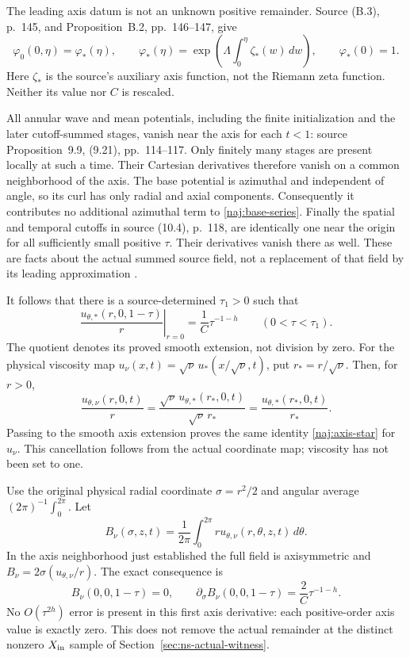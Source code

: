 The leading axis datum is not an unknown positive remainder. Source
(B.3), p.~145, and Proposition~B.2, pp.~146--147, give
\[
 \varphi_0(0,\eta)=\varphi_*(\eta),\qquad
 \varphi_*(\eta)=
  \exp\left(\Lambda\int_0^\eta\zeta_*(w)\,dw\right),\qquad
 \varphi_*(0)=1.
\]
Here \(\zeta_*\) is the source's auxiliary axis function, not the
Riemann zeta function. Neither its value nor \(C\) is rescaled.

All annular wave and mean potentials, including the finite
initialization and the later cutoff-summed stages, vanish near the axis
for each \(t<1\): source Proposition~9.9, (9.21), pp.~114--117.
Only finitely many stages are present locally at such a time. Their
Cartesian derivatives therefore vanish on a common neighborhood of the
axis. The base potential is azimuthal and independent of angle, so its
curl has only radial and axial components. Consequently it contributes
no additional azimuthal term to \eqref{naj:base-series}.
Finally the spatial and temporal cutoffs in source (10.4), p.~118,
are identically one near the origin for all sufficiently small
positive \(\tau\). Their derivatives vanish there as well.
These are facts about the actual summed source field, not a
replacement of that field by its leading approximation
\cite[Lemma 5.1; Proposition 5.5; (9.21); (10.4); (B.3)]{openaiNS2026release}.

It follows that there is a source-determined \(\tau_1>0\) such that
\begin{equation}\label{naj:axis-star}
 \left.\frac{u_{\theta,*}(r,0,1-\tau)}r\right|_{r=0}
       =\frac1C\tau^{-1-h}\qquad(0<\tau<\tau_1).
\end{equation}
The quotient denotes its proved smooth extension, not division by
zero. For the physical viscosity map
\(u_\nu(x,t)=\sqrt\nu\,u_*(x/\sqrt\nu,t)\), put
\(r_*=r/\sqrt\nu\). Then, for \(r>0\),
\[
 \frac{u_{\theta,\nu}(r,0,t)}r
 =\frac{\sqrt\nu\,u_{\theta,*}(r_*,0,t)}{\sqrt\nu\,r_*}
 =\frac{u_{\theta,*}(r_*,0,t)}{r_*}.
\]
Passing to the smooth axis extension proves the same identity
\eqref{naj:axis-star} for \(u_\nu\). This cancellation follows from the
actual coordinate map; viscosity has not been set to one.

Use the original physical radial coordinate
\(\sigma=r^2/2\) and angular average \( (2\pi)^{-1}\int_0^{2\pi}\).
Let
\[
 B_\nu(\sigma,z,t)=
    \frac1{2\pi}\int_0^{2\pi} r u_{\theta,\nu}(r,\theta,z,t)\,d\theta .
\]
In the axis neighborhood just established the full field is
axisymmetric and \(B_\nu=2\sigma(u_{\theta,\nu}/r)\).
The exact consequence is
\begin{equation}\label{naj:B-axis}
 B_\nu(0,0,1-\tau)=0,\qquad
 \partial_\sigma B_\nu(0,0,1-\tau)=\frac2C\tau^{-1-h}.
\end{equation}
No \(O(\tau^{2h})\) error is present in this first axis derivative:
each positive-order axis value is exactly zero. This does not remove
the actual remainder at the distinct nonzero \(X_{\rm in}\) sample
of Section~\ref{sec:ns-actual-witness}.

